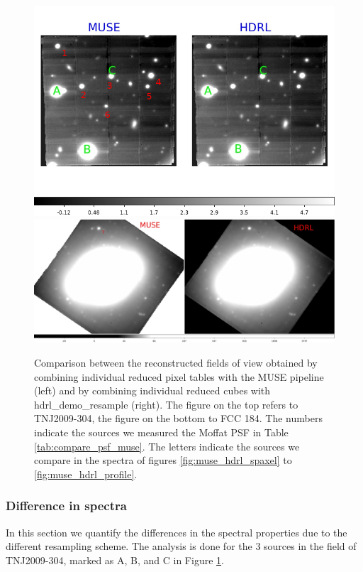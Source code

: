 \begin{figure}[H]
\centering
\includegraphics[width=17cm]{figures/fovs.jpg}
\includegraphics[width=17cm]{figures/fovs2.jpg}
\caption[] {\footnotesize Comparison between the reconstructed fields
  of view obtained by combining individual reduced pixel tables with
  the MUSE pipeline (left) and by combining individual reduced cubes
  with hdrl\_demo\_resample (right). The figure on the top refers to
  TNJ2009-304, the figure on the bottom to FCC 184. The numbers
  indicate the sources we measured the Moffat PSF in Table
  \ref{tab:compare_psf_muse}. The letters indicate the sources we
  compare in the spectra of figures \ref{fig:muse_hdrl_spaxel} to
  \ref{fig:muse_hdrl_profile}. }
	\label{fig:muse_hdrl_fov}
\end{figure}


\subsubsection{Difference in spectra}

In this section we quantify the differences in the spectral properties
due to the different resampling scheme. The analysis is done for the 3
sources in the field of TNJ2009-304, marked as A, B, and C in Figure
\ref{fig:muse_hdrl_fov}.

